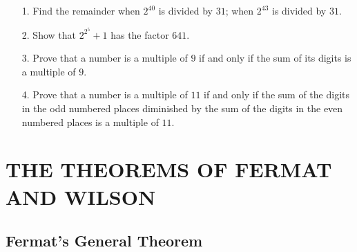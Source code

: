 \documentclass[oneside]{book}
\begin{document}
\small \begin{enumerate}
\item[1.] Find the remainder when $2^{40}$ is divided by $31$; when
$2^{43}$ is divided by $31$.

\item[2.] Show that $2^{2^5}+1$ has the factor $641$.

\item[3.] Prove that a number is a multiple of $9$ if and only if the
sum of its digits is a multiple of $9$.

\item[4.] Prove that a number is a multiple of $11$ if and only if the
sum of the digits in the odd numbered places diminished by the sum
of the digits in the even numbered places is a multiple of $11$.
\end{enumerate} \normalsize%

\chapter{THE THEOREMS OF FERMAT AND WILSON}

\section{Fermat's General Theorem}\label{s23}%
\end{document}
